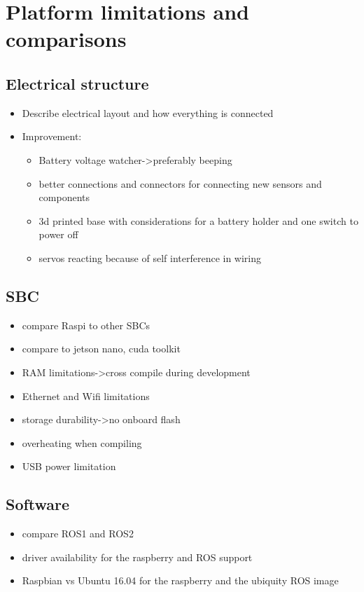 \chapter{Platform limitations and comparisons}\label{cha:PlatformLimits}

\section{Electrical structure}\label{sec:elec_struct}
\begin{itemize}
\item Describe electrical layout and how everything is connected
\item Improvement:
 \begin{itemize}
  \item Battery voltage watcher->preferably beeping
  \item better connections and connectors for connecting new sensors and components
  \item 3d printed base with considerations for a battery holder and one switch to power off
  \item servos reacting because of self interference in wiring
 \end{itemize}
\end{itemize}

\section{SBC}\label{sec:sbc_lim}
\begin{itemize}
 \item compare Raspi to other SBCs
 \item compare to jetson nano, cuda toolkit
 \item RAM limitations->cross compile during development
 \item Ethernet and Wifi limitations
 \item storage durability->no onboard flash
 \item overheating when compiling
 \item USB power limitation
\end{itemize}

\section{Software}\label{software_lim}
\begin{itemize}
 \item compare ROS1 and ROS2
 \item driver availability for the raspberry and ROS support
 \item Raspbian vs Ubuntu 16.04 for the raspberry and the ubiquity ROS image
\end{itemize}

